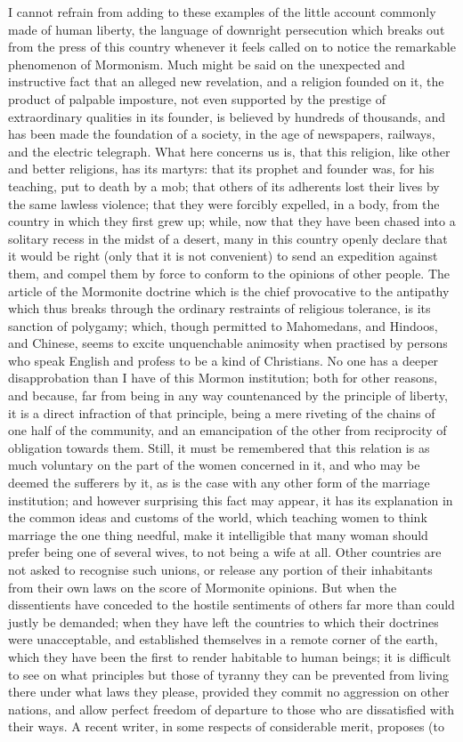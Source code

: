 \documentclass[11pt,openany]{book}
\begin{document}
I cannot refrain from adding to these examples of the little account commonly made of human liberty, the language of downright persecution which breaks out from the press of this country whenever it feels called on to notice the remarkable phenomenon of Mormonism. Much might be said on the unexpected and instructive fact that an alleged new revelation, and a religion founded on it, the product of palpable imposture, not even supported by the prestige of extraordinary qualities in its founder, is believed by hundreds of thousands, and has been made the foundation of a society, in the age of newspapers, railways, and the electric telegraph. What here concerns us is, that this religion, like other and better religions, has its martyrs: that its prophet and founder was, for his teaching, put to death by a mob; that others of its adherents lost their lives by the same lawless violence; that they were forcibly expelled, in a body, from the country in which they first grew up; while, now that they have been chased into a solitary recess in the midst of a desert, many in this country openly declare that it would be right (only that it is not convenient) to send an expedition against them, and compel them by force to conform to the opinions of other people. The article of the Mormonite doctrine which is the chief provocative to the antipathy which thus breaks through the ordinary restraints of religious tolerance, is its sanction of polygamy; which, though permitted to Mahomedans, and Hindoos, and Chinese, seems to excite unquenchable animosity when practised by persons who speak English and profess to be a kind of Christians. No one has a deeper disapprobation than I have of this Mormon institution; both for other reasons, and because, far from being in any way countenanced by the principle of liberty, it is a direct infraction of that principle, being a mere riveting of the chains of one half of the community, and an emancipation of the other from reciprocity of obligation towards them. Still, it must be remembered that this relation is as much voluntary on the part of the women concerned in it, and who may be deemed the sufferers by it, as is the case with any other form of the marriage institution; and however surprising this fact may appear, it has its explanation in the common ideas and customs of the world, which teaching women to think marriage the one thing needful, make it intelligible that many woman should prefer being one of several wives, to not being a wife at all. Other countries are not asked to recognise such unions, or release any portion of their inhabitants from their own laws on the score of Mormonite opinions. But when the dissentients have conceded to the hostile sentiments of others far more than could justly be demanded; when they have left the countries to which their doctrines were unacceptable, and established themselves in a remote corner of the earth, which they have been the first to render habitable to human beings; it is difficult to see on what principles but those of tyranny they can be prevented from living there under what laws they please, provided they commit no aggression on other nations, and allow perfect freedom of departure to those who are dissatisfied with their ways. A recent writer, in some respects of considerable merit, proposes (to 
\end{document}
